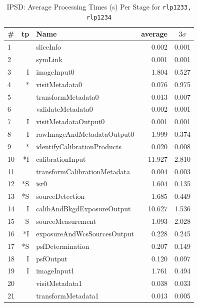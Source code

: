 \begin{table}[p]
\begin{center}
\small
\caption{IPSD: Average Processing Times (s) Per Stage for {\tt rlp1233, rlp1234}
\label{tbl:ipsdstages}}
\vspace{\baselineskip}
\begin{tabular}{lrlrr}
\hline\hline
\# & tp & Name & \multicolumn{1}{c}{average}&\multicolumn{1}{c}{$3\sigma$} \\ 
\hline
 1 &    &                     sliceInfo &  0.002 &  0.001 \\
 2 &    &                       symLink &  0.001 &  0.001 \\
 3 &  I &                   imageInput0 &  1.804 &  0.527 \\
 4 & *\phantom{I} &                visitMetadata0 &  0.076 &  0.975 \\
 5 &    &            transformMetadata0 &  0.013 &  0.007 \\
 6 &    &             validateMetadata0 &  0.002 &  0.001 \\
 7 &  I &          visitMetadataOutput0 &  0.001 &  0.001 \\
 8 &  I &    rawImageAndMetadataOutput0 &  1.999 &  0.374 \\
 9 & *\phantom{I}  &   identifyCalibrationProducts &  0.020 &  0.008 \\
10 & *I &              calibrationInput & 11.927 &  2.810 \\
11 &    &  transformCalibrationMetadata &  0.004 &  0.003 \\
12 & *S &                          isr0 &  1.604 &  0.135 \\
13 & *S &               sourceDetection &  1.685 &  0.449 \\
14 &  I &    calibAndBkgdExposureOutput & 10.627 &  1.536 \\
15 &  S &             sourceMeasurement &  1.093 &  2.028 \\
16 & *I &   exposureAndWcsSourcesOutput &  0.228 &  0.245 \\
17 & *S &              psfDetermination &  0.207 &  0.149 \\
18 &  I &                     psfOutput &  0.120 &  0.097 \\
19 &  I &                   imageInput1 &  1.761 &  0.494 \\
20 &    &                visitMetadata1 &  0.038 &  0.033 \\
21 &    &            transformMetadata1 &  0.013 &  0.005 \\

\end{tabular}
\end{center}
\end{table}
